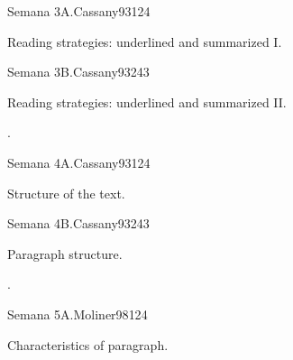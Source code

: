 \begin{syllabus}
\begin{unit}{}{Semana 3A.}{Cassany93}{12}{4}
   \begin{topics}
      \item Reading strategies: underlined and summarized I.
   \end{topics}
   \begin{learningoutcomes}
      \item 
   \end{learningoutcomes}
\end{unit}

\begin{unit}{}{Semana 3B.}{Cassany93}{24}{3}
   \begin{topics}
      \item Reading strategies: underlined and summarized II.
   \end{topics}

   \begin{learningoutcomes}
      \item .
      \end{learningoutcomes}
\end{unit}

\begin{unit}{}{Semana 4A.}{Cassany93}{12}{4}
   \begin{topics}
      \item Structure of the text.
   \end{topics}
   \begin{learningoutcomes}
      \item 
   \end{learningoutcomes}
\end{unit}

\begin{unit}{}{Semana 4B.}{Cassany93}{24}{3}
   \begin{topics}
      \item Paragraph structure.
   \end{topics}

   \begin{learningoutcomes}
      \item .
      \end{learningoutcomes}
\end{unit}

\begin{unit}{}{Semana 5A.}{Moliner98}{12}{4}
   \begin{topics}
      \item Characteristics of paragraph.
   \end{topics}
   \begin{learningoutcomes}
      \item 
   \end{learningoutcomes}
\end{unit}


\end{syllabus}
